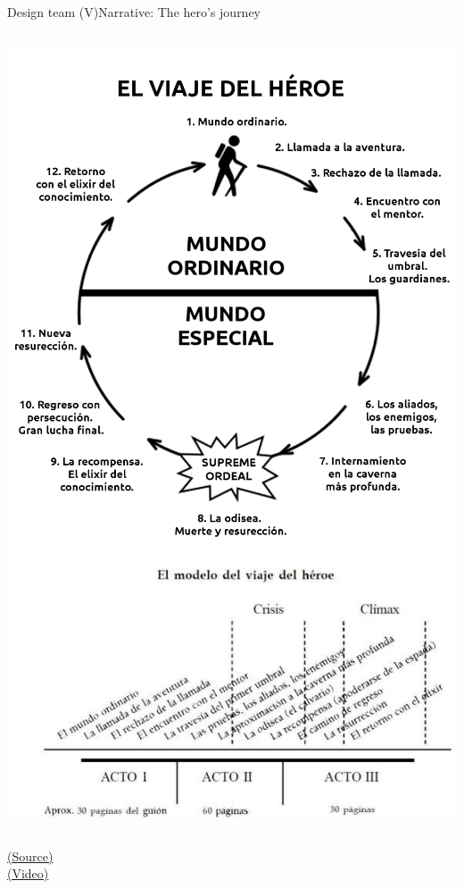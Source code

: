\documentclass[10pt,compress]{beamer} %
\begin{document}
\begin{frame}{Design team (V)}{Narrative: The hero's journey}
    \begin{columns}
	\centering \includegraphics[width=\linewidth]{figs/heroe}
	\centering \includegraphics[width=\linewidth]{figs/actos}
    \end{columns}
	\centering \href{https://primerborrador.com/viaje-del-heroe/}{\tiny{(Source)}}\\
    \centering \href{https://www.youtube.com/watch?v=d1Zxt28ff-E}{(Video)}
\end{frame}
\end{document}
